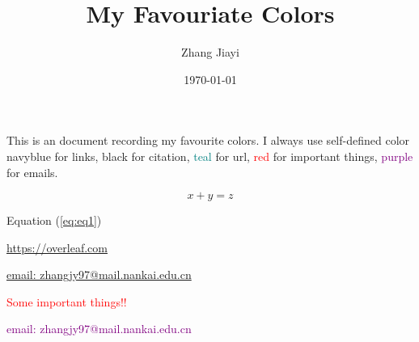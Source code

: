 \documentclass{article}
\title{My Favouriate Colors}
\author{Zhang Jiayi}
\date{\today}
\begin{document}
	\maketitle
	
    This is an document recording my favourite colors. I always use self-defined 
    color \textcolor{navyblue}{navyblue} for links, black for citation, \textcolor{teal}{teal} 
    for url, \textcolor{red}{red} for important things, \textcolor{purple}{purple} for emails.
    
    \begin{equation}\label{eq:eq1}
    	x + y = z
    \end{equation}
    
    \Huge
    Equation (\ref{eq:eq1})
    
    \href{https://overleaf.com}{https://overleaf.com}
    
    \href{zhangjy97@mail.nankai.edu.cn}{email: zhangjy97@mail.nankai.edu.cn}
    
    \textcolor{red}{Some important things!!}
    
    \textcolor{purple}{email: zhangjy97@mail.nankai.edu.cn}
\end{document}
